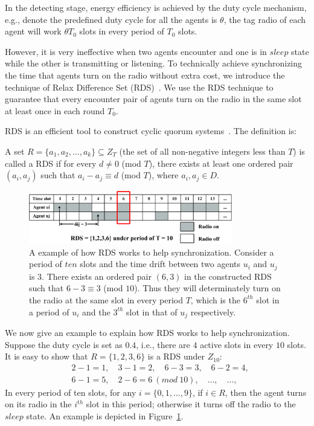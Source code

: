 In the detecting stage,  
energy efficiency is achieved by the duty cycle mechanism, 
e.g., denote the predefined duty cycle for 
all the agents is $\theta$, the tag radio of each agent will work
$\theta T_0$ slots in every period of $T_0$ slots. 

However, it is very ineffective
when two agents encounter and one is in $sleep$ state while the other is transmitting
or listening. 
To technically achieve synchronizing the time that agents turn on the radio without extra cost,
we introduce the technique of Relax Difference Set (RDS)~\cite{luk1997two}.
We use the RDS technique to guarantee that every encounter pair 
of agents turn on the radio in the same slot at least once in each round $T_0$.

RDS is an efficient tool to construct cyclic quorum systems~\cite{Peleg1995The}. 
The definition is:
\begin{definition}
A set $R=\{a_1,a_2,...,a_k\} \subseteq Z_T$ (the set of all non-negative integers less than $T$)
is called a RDS if for every $d \neq 0$ (mod $T$),
there exists at least one ordered pair $(a_i,a_j)$ such that $a_i - a_j \equiv d$ (mod $T$), 
where $a_i,a_j \in D$.
\end{definition}

\begin{figure}[h]
    \centering
    \includegraphics[width=3.5in]{figures/RDS}
    \caption{A example of how RDS works to help synchronization. Consider a period
    of $ten$ slots and the time drift between two agents $u_i$ and 
    $u_j$ is $3$. There exists an ordered pair $(6,3)$ in the constructed RDS such that $6 - 3 \equiv 3$ (mod $10$). Thus 
    they will determinately turn on the radio at the same slot in every period $T$, 
    which is the $6^{th}$ slot in a period of $u_i$ and the $3^{th}$ slot in that of $u_j$ respectively.}
    \label{exampleRDS}
\end{figure}

We now give an example to explain how RDS works to help synchronization.
Suppose the duty cycle is set as $0.4$, i.e., there are $4$ active slots 
in every $10$ slots. It is easy to show that $R=\{1,2,3,6\}$ is a RDS
under $Z_{10}$:
\begin{align*}
    &2 - 1 = 1,\quad 3 - 1 = 2,\quad 6 - 3 = 3,\quad 6 - 2 = 4, \\
    &6 - 1 = 5,\quad {2 - 6 = 6}~{(mod~10)},\quad \dots,\quad \dots, 
\end{align*}
In every period of ten slots, for any $i = \{0,1,\dots,9\}$, if $i \in R$, then
the agent turns on its radio in the $i^{th}$ slot in this period; otherwise it turns off the 
radio to the $sleep$ state. An example is depicted in Figure~\ref{exampleRDS}. 




